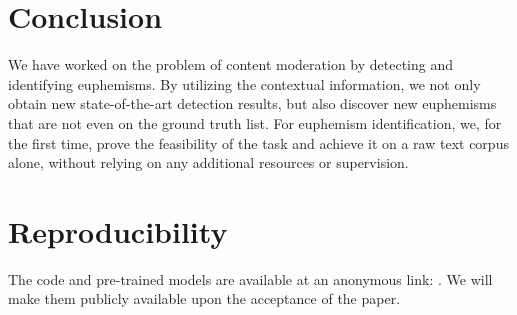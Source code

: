 
\section{Conclusion}
\label{sec:conclusion}

We have worked on the problem of content moderation by detecting and identifying euphemisms. 
By utilizing the contextual information, we not only obtain new state-of-the-art detection results, but also discover new euphemisms that are not even on the ground truth list. 
For euphemism identification, we, for the first time, prove the feasibility of the task and achieve it on a raw text corpus alone, without relying on any additional resources or supervision. 




\section*{Reproducibility}
The code and pre-trained models are available at an anonymous link: . 
We will make them publicly available upon the acceptance of the paper. 
